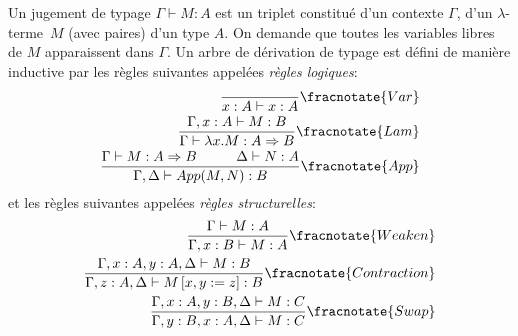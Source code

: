 \documentclass[math, info]{cours}
\def\lambdaterme{$\lambda$-terme\ }
\begin{document}
\begin{definition}
	Un jugement de typage $\Gamma\vdash M: A$ est un triplet constitué d'un contexte $\Gamma$, d'un \lambdaterme $M$ (avec paires) d'un type $A$.
	On demande que toutes les variables libres de $M$ apparaissent dans $\Gamma$.
	Un arbre de dérivation de typage est défini de manière inductive par les règles suivantes appelées \emph{règles logiques}:
	\begin{align*}
		\frac{}{x:A \vdash x:A}\fracnotate{Var}\\
		\frac{\Gamma, x:A\vdash M:B}{\Gamma\vdash \lambda x.M:A\Rightarrow B}\fracnotate{Lam}\\
		\frac{\Gamma\vdash M:A \Rightarrow B \hspace{1cm} \Delta \vdash N:A}{\Gamma, \Delta\vdash App(M, N):B}\fracnotate{App}
	\end{align*}
	et les règles suivantes appelées \emph{règles structurelles}:
	\begin{align*}
		\frac{\Gamma\vdash M:A}{\Gamma, x:B\vdash M:A}\fracnotate{Weaken}\\
		\frac{\Gamma, x:A, y:A, \Delta\vdash M:B}{\Gamma, z:A, \Delta\vdash M\left[ x, y := z \right]: B}\fracnotate{Contraction}\\
		\frac{\Gamma, x:A, y:B, \Delta\vdash M:C}{\Gamma, y:B, x:A, \Delta\vdash M:C}\fracnotate{Swap}
	\end{align*}
\end{definition}
\end{document}
